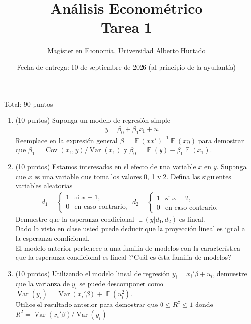 \documentclass[letterpaper,11pt]{article}
\theoremstyle{plain}
\theoremstyle{definition}
\theoremstyle{remark}
\DeclareMathOperator{\Var}{Var}
\DeclareMathOperator{\Cov}{Cov}
\DeclareMathOperator{\E}{\mathbb{E}}
\begin{document}
	
	\title {An\'alisis Econom\'etrico  \\ Tarea 1}
	\author{Mag\'ister en Econom\'ia, Universidad Alberto Hurtado}
	\date{Fecha de entrega: 10 de septiembre de 2026 (al principio de la ayudant\'ia)}
\maketitle

Total: 90 puntos

\begin{enumerate}
    \item (10 puntos) Suponga un modelo de regresi\'on simple
        \begin{align*}
            y = \beta_0 + \beta_1 x_{1} + u.
        \end{align*}
    Reemplace en la expresi\'on general $\beta=\E(xx')^{-1}\E(xy)$ para demostrar que $\beta_1=\Cov(x_{1},y)/\Var(x_{1})$ y $\beta_0=\E(y)-\beta_1 \E(x_{1})$.
    \item (10 puntos) Estamos interesados en el efecto de una variable $x$ en $y$. Suponga que $x$ es una variable que toma los valores 0, 1 y 2. Defina las siguientes variables aleatorias
    \begin{align*}
    d_1 = 
    \begin{cases}
    1 & \mbox{si } x = 1, \\
    0 & \mbox{en caso contrario, }
    \end{cases}
    d_2 = 
    \begin{cases}
    1 & \mbox{si } x = 2, \\
    0 & \mbox{en caso contrario. }
    \end{cases}
    \end{align*}
    Demuestre que la esperanza condicional $\E(y|d_1,d_2)$ es lineal. \\
    Dado lo visto en clase usted puede deducir que la proyecci\'on lineal es igual a la esperanza condicional. \\ 
    El modelo anterior pertenece a una familia de modelos con la caracter\'istica que la esperanza condicional es lineal ?`Cu\'al es \'esta familia de modelos?
    \item (10 puntos) Utilizando el modelo lineal de regresi\'on $y_i = x_{i}'\beta +u_i$, demuestre que la varianza de $y_i$ se puede descomponer como $\Var(y_i)= \Var(x_i'\beta)+\E(u_i^2)$.\\
    Utilice el resultado anterior para demostrar que $0 \leq R^2 \leq 1$ donde  $R^2=\Var(x_i'\beta)/\Var(y_i)$.

\end{enumerate}
\end{document}
